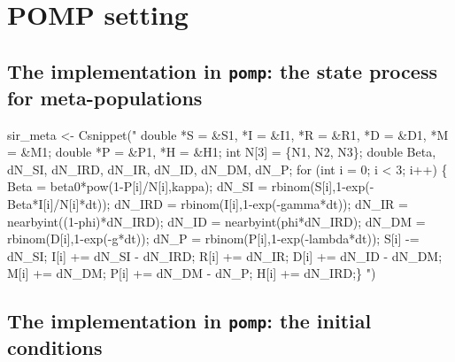\documentclass[
  letterpaper,
  DIV=11,
  numbers=noendperiod]{scrartcl}
\newenvironment{Shaded}{\begin{snugshade}}{\end{snugshade}}
\newcommand{\FunctionTok}[1]{\textcolor[rgb]{0.28,0.35,0.67}{#1}}
\newcommand{\NormalTok}[1]{\textcolor[rgb]{0.00,0.23,0.31}{#1}}
\newcommand{\OtherTok}[1]{\textcolor[rgb]{0.00,0.23,0.31}{#1}}
\newcommand{\StringTok}[1]{\textcolor[rgb]{0.13,0.47,0.30}{#1}}
\begin{document}
\hypertarget{pomp-setting}{%
\section{POMP setting}\label{pomp-setting}}

\hypertarget{the-implementation-in-pomp-the-state-process-for-meta-populations}{%
\subsection{\texorpdfstring{The implementation in \texttt{pomp}: the
state process for
meta-populations}{The implementation in pomp: the state process for meta-populations}}\label{the-implementation-in-pomp-the-state-process-for-meta-populations}}

\begin{Shaded}
\begin{Highlighting}[]
\NormalTok{sir\_meta }\OtherTok{\textless{}{-}} \FunctionTok{Csnippet}\NormalTok{(}\StringTok{"}
\StringTok{  double *S = \&S1, *I = \&I1, *R = \&R1, *D = \&D1, *M = \&M1;}
\StringTok{  double *P = \&P1, *H = \&H1; int N[3] = \{N1, N2, N3\};}
\StringTok{  double Beta, dN\_SI, dN\_IRD, dN\_IR, dN\_ID, dN\_DM, dN\_P;}
\StringTok{  for (int i = 0; i \textless{} 3; i++) \{}
\StringTok{    Beta = beta0*pow(1{-}P[i]/N[i],kappa);}
\StringTok{    dN\_SI = rbinom(S[i],1{-}exp({-}Beta*I[i]/N[i]*dt));}
\StringTok{    dN\_IRD = rbinom(I[i],1{-}exp({-}gamma*dt));}
\StringTok{    dN\_IR = nearbyint((1{-}phi)*dN\_IRD); dN\_ID = nearbyint(phi*dN\_IRD);}
\StringTok{    dN\_DM = rbinom(D[i],1{-}exp({-}g*dt));}
\StringTok{    dN\_P = rbinom(P[i],1{-}exp({-}lambda*dt));}
\StringTok{    S[i] {-}= dN\_SI; I[i] += dN\_SI {-} dN\_IRD; R[i] += dN\_IR; }
\StringTok{    D[i] += dN\_ID {-} dN\_DM; M[i] += dN\_DM; P[i] += dN\_DM {-} dN\_P;}
\StringTok{    H[i] += dN\_IRD;\}}
\StringTok{"}\NormalTok{)}
\end{Highlighting}
\end{Shaded}

\hypertarget{the-implementation-in-pomp-the-initial-conditions}{%
\subsection{\texorpdfstring{The implementation in \texttt{pomp}: the
initial
conditions}{The implementation in pomp: the initial conditions}}\label{the-implementation-in-pomp-the-initial-conditions}}
\end{document}
